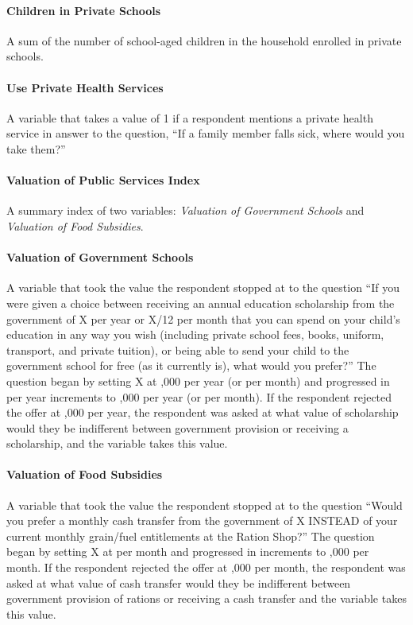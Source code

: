 \documentclass[hidelinks, 12pt, titlepage]{article}
\begin{document}
			\paragraph{Children in Private Schools} A sum of the number of school-aged children in the household enrolled in private schools.

			\paragraph{Use Private Health Services} A variable that takes a value of 1 if a respondent mentions a private health service in answer to the question, ``If a family member falls sick, where would you take them?''

			\paragraph{Valuation of Public Services Index} A summary index of two variables: \emph{Valuation of Government Schools} and \emph{Valuation of Food Subsidies}.

			\paragraph{Valuation of Government Schools} A variable that took the value the respondent stopped at to the question ``If you were given a choice between receiving an annual education scholarship from the government of \rupee X per year or \rupee X/12 per month that you can spend on your child's education in any way you wish (including private school fees, books, uniform, transport, and private tuition), or being able to send your child to the government school for free (as it currently is), what would you prefer?''  The question began by setting X at ,000 per year (or  per month) and progressed in  per year increments to ,000 per year (or  per month).  If the respondent rejected the offer at ,000 per year, the respondent was asked at what value of scholarship would they be indifferent between government provision or receiving a scholarship, and the variable takes this value.

			\paragraph{Valuation of Food Subsidies} A variable that took the value the respondent stopped at to the question ``Would you prefer a monthly cash transfer from the government of \rupee X INSTEAD of your current monthly grain/fuel entitlements at the Ration Shop?''  The question began by setting X at  per month and progressed in  increments to ,000 per month.  If the respondent rejected the offer at ,000 per month, the respondent was asked at what value of cash transfer would they be indifferent between government provision of rations or receiving a cash transfer and the variable takes this value.
\end{document}
